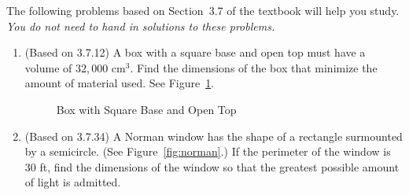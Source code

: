 \documentclass{article}
\title{\commonPSTitleZeroThreeSeven}
\author{\commonAuthor}
\date{\commonDateZeroThreeSeven}
\begin{document}
\maketitle
\thispagestyle{empty}

\noindent
The following problems based on Section~3.7 of the textbook will help
you study.  \emph{You do not need to hand in solutions to these
  problems.}
\begin{enumerate}
\item (Based on 3.7.12)
  A box with a square base and open top must have a volume of 
  $32,000$ cm$^3$.  Find the dimensions of the box that minimize
  the amount of material used.  See Figure~\ref{fig:box}.
  \begin{figure}[htbp]
    \centering
    \caption{Box with Square Base and Open Top}
    \label{fig:box}
  \end{figure}
\item (Based on 3.7.34) A Norman window has the shape of a rectangle
  surmounted by a semicircle.  (See Figure~\ref{fig:norman}.)  If the
  perimeter of the window is $30$ ft, find the dimensions of the
  window so that the greatest possible amount of light is admitted.
  \begin{figure}[htbp]
    \centering

\end{figure}
\end{enumerate}
\end{document}
